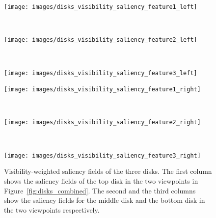 \begin{figure}
	\centering
	\begin{minipage}{.3\textwidth}
		\texttt{[image: images/disks\_visibility\_saliency\_feature1\_left]}
	\end{minipage}~
	\begin{minipage}{.3\textwidth}
		\texttt{[image: images/disks\_visibility\_saliency\_feature2\_left]}
	\end{minipage}~
	\begin{minipage}{.3\textwidth}
		\texttt{[image: images/disks\_visibility\_saliency\_feature3\_left]}
	\end{minipage}
	\begin{minipage}{.3\textwidth}
		\texttt{[image: images/disks\_visibility\_saliency\_feature1\_right]}
	\end{minipage}~
	\begin{minipage}{.3\textwidth}
		\texttt{[image: images/disks\_visibility\_saliency\_feature2\_right]}
	\end{minipage}~
	\begin{minipage}{.3\textwidth}
		\texttt{[image: images/disks\_visibility\_saliency\_feature3\_right]}
	\end{minipage}
	\caption{Visibility-weighted saliency fields of the three disks. The first column shows the saliency fields of the top disk in the two viewpoints in Figure~\ref{fig:disks_combined}. The second and the third columns show the saliency fields for the middle disk and the bottom disk in the two viewpoints respectively.}
	\label{fig:disks_visibility_saliency_fields}
\end{figure}

